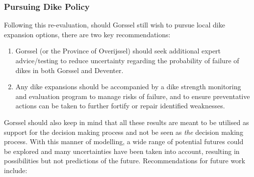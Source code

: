 \subsubsection{Pursuing Dike Policy}
Following this re-evaluation, should Gorssel still wish to pursue local dike expansion options, there are two key recommendations:
\begin{enumerate}
    \item Gorssel (or the Province of Overijssel) should seek additional expert advice/testing to reduce uncertainty regarding the probability of failure of dikes in both Gorssel and Deventer.
    \item Any dike expansions should be accompanied by a dike strength monitoring and evaluation program to manage risks of failure, and to ensure preventative actions can be taken to further fortify or repair identified weaknesses.
\end{enumerate}

Gorssel should also keep in mind that all these results are meant to be utilised as support for the decision making process and not be seen as \textit{the} decision making process. With this manner of modelling, a wide range of potential futures could be explored and many uncertainties have been taken into account, resulting in possibilities but not predictions of the future. Recommendations for future work include: 